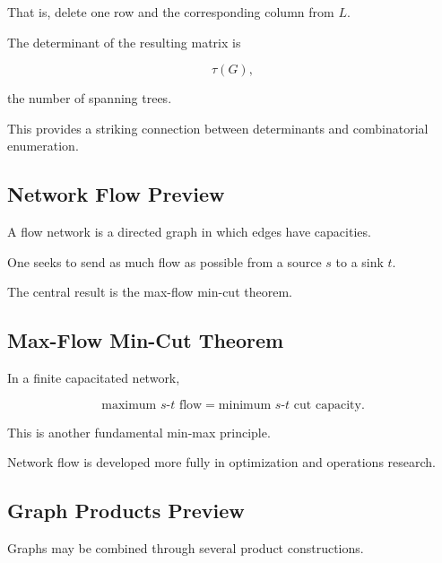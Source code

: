 That is, delete one row and the corresponding column from \(L\).

The determinant of the resulting matrix is

\[
\boxed{
\tau(G),
}
\]

the number of spanning trees.

This provides a striking connection between determinants and
combinatorial enumeration.

\subsection{Network Flow Preview}
\label{subsec:network-flow-preview}

A flow network is a directed graph in which edges have capacities.

One seeks to send as much flow as possible from a source \(s\) to a
sink \(t\).

The central result is the max-flow min-cut theorem.

\subsection{Max-Flow Min-Cut Theorem}
\label{subsec:max-flow-min-cut-preview}

\begin{theorem}
In a finite capacitated network,

\[
\boxed{
\text{maximum }s\text{-}t\text{ flow}
=
\text{minimum }s\text{-}t\text{ cut capacity}.
}
\]
\end{theorem}

This is another fundamental min-max principle.

Network flow is developed more fully in optimization and operations
research.

\subsection{Graph Products Preview}
\label{subsec:graph-products-preview}

Graphs may be combined through several product constructions.

